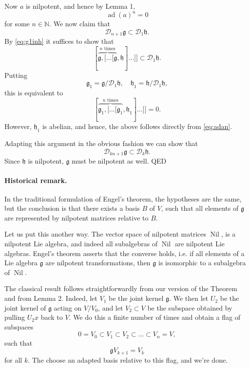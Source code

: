 \documentclass[12pt]{article}
\newcommand{\lag}{\mathfrak{g}}
\newcommand{\lah}{\mathfrak{h}}
\newcommand{\ad}{\mathop{\mathrm{ad}}\nolimits}
\newcommand{\Nil}{\mathop{\mathrm{Nil}}\nolimits}
\newcommand{\cD}{\mathcal{D}}
\newcommand{\natnums}{\mathbb{N}}
\begin{document}
Now $a$ is nilpotent, and hence by Lemma 1, 
\begin{equation}
  \label{eq:adan}
  \ad(a)^n=0  
\end{equation}
for some $n\in \natnums$.  We now claim that 
$$\cD_{n+1}\lag\subset\cD_1\lah.$$
By \eqref{eq:g1inh} it suffices to show that 
$$[\overbrace{\lag,[\ldots
  [\lag}^{n\text{ times}},\lah]\ldots ]]\subset\cD_1\lah.$$
Putting
$$\lag_1=\lag/\cD_1\lah,\quad \lah_1=\lah/\cD_1\lah, $$
this is equivalent to
$$[\overbrace{\lag_1,[\ldots
  [\lag_1}^{n\text{ times}},\lah_1]\ldots ]]=0.$$
However, $\lah_1$ is abelian, and hence, the above follows directly
from \eqref{eq:adan}.

Adapting this argument in the obvious fashion we can show that
$$\cD_{kn+1}\lag\subset\cD_k \lah.$$
Since $\lah$ is nilpotent, $\lag$ must be nilpotent as well. QED

\paragraph{Historical remark.}
In the traditional formulation of Engel's theorem, the hypotheses are
the same, but the conclusion is that there exists a basis $B$ of $V$,
such that all elements of $\lag$ are represented by nilpotent matrices
relative to $B$.   

Let us put this another way.  The vector space of nilpotent matrices
$\Nil$, is a nilpotent Lie algebra, and indeed all subalgebras of $\Nil$ are
nilpotent Lie algebras.  Engel's theorem asserts that the converse
holds, i.e. if all elements of a Lie algebra $\lag$ are  nilpotent
transformations, then $\lag$ is isomorphic to a subalgebra of $\Nil$.

The classical result follows straightforwardly from our version of the
Theorem and from Lemma 2.  Indeed, let $V_1$ be the joint kernel
$\lag$.  We then let $U_2$ be the joint kernel of $\lag$ acting on
$V/V_0$, and let $V_2\subset V$ be the subspace obtained by pulling
$U_2x$ back to $V$.  We do this a finite number of times and obtain a
flag of subspaces
$$0=V_0\subset V_1\subset V_2\subset \ldots \subset V_n=V,$$
such that
$$\lag V_{k+1} = V_k$$
for all $k$.  The choose an adapted basis
relative to this flag, and we're done.
\end{document}
